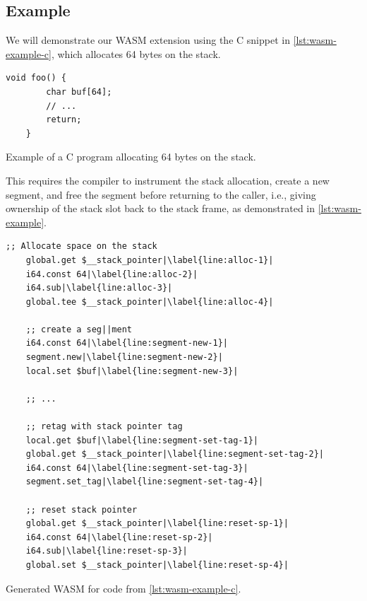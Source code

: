 \subsection{Example}
\label{subsec:example}

We will demonstrate our \ac{WASM} extension using the C snippet in \cref{lst:wasm-example-c}, which allocates 64 bytes on the stack.

\begin{lstfloat}
    \begin{lstlisting}[frame=h,style=customc,
        label={lst:wasm-example-c-inner}]
    void foo() {
        char buf[64];
        // ...
        return;
    }
    \end{lstlisting}
    \caption{Example of a C program allocating 64 bytes on the stack.}
    \label{lst:wasm-example-c}
\end{lstfloat}

\noindent
This requires the compiler to instrument the stack allocation, create a new segment, and free the segment before returning to the caller, i.e., giving ownership of the stack slot back to the stack frame, as demonstrated in \cref{lst:wasm-example}.

\begin{lstfloat}
    \begin{lstlisting}[frame=h,style=customwasm,
        label={lst:wasm-example-inner},escapechar=|]
    ;; Allocate space on the stack
    global.get $__stack_pointer|\label{line:alloc-1}|
    i64.const 64|\label{line:alloc-2}|
    i64.sub|\label{line:alloc-3}|
    global.tee $__stack_pointer|\label{line:alloc-4}|

    ;; create a seg||ment
    i64.const 64|\label{line:segment-new-1}|
    segment.new|\label{line:segment-new-2}|
    local.set $buf|\label{line:segment-new-3}|

    ;; ...

    ;; retag with stack pointer tag
    local.get $buf|\label{line:segment-set-tag-1}|
    global.get $__stack_pointer|\label{line:segment-set-tag-2}|
    i64.const 64|\label{line:segment-set-tag-3}|
    segment.set_tag|\label{line:segment-set-tag-4}|

    ;; reset stack pointer
    global.get $__stack_pointer|\label{line:reset-sp-1}|
    i64.const 64|\label{line:reset-sp-2}|
    i64.sub|\label{line:reset-sp-3}|
    global.set $__stack_pointer|\label{line:reset-sp-4}|
    \end{lstlisting}
    \caption{Generated \ac{WASM} for code from \cref{lst:wasm-example-c}.}
    \label{lst:wasm-example}
\end{lstfloat}

